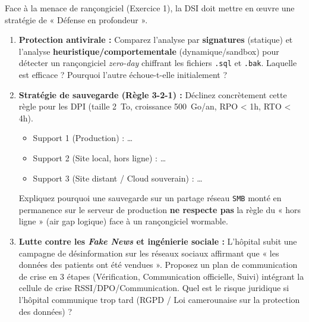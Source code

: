 \documentclass[11pt]{article}
\begin{document}
\begin{exercice}
\label{exo:defense_depth}
Face à la menace de rançongiciel (Exercice 1), la DSI doit mettre en œuvre une stratégie de « Défense en profondeur ».
\begin{enumerate}
    \item \textbf{Protection antivirale :} Comparez l'analyse par \textbf{signatures} (statique) et l'analyse \textbf{heuristique/comportementale} (dynamique/sandbox) pour détecter un rançongiciel \textit{zero-day} chiffrant les fichiers \texttt{.sql} et \texttt{.bak}. Laquelle est efficace ? Pourquoi l'autre échoue-t-elle initialement ?
    \item \textbf{Stratégie de sauvegarde (Règle 3-2-1) :} Déclinez concrètement cette règle pour les DPI (taille \SI{2}{To}, croissance \SI{500}{Go}/an, RPO < 1h, RTO < 4h).
        \begin{itemize}
            \item Support 1 (Production) : \dots
            \item Support 2 (Site local, hors ligne) : \dots
            \item Support 3 (Site distant / Cloud souverain) : \dots
        \end{itemize}
        Expliquez pourquoi une sauvegarde sur un partage réseau \texttt{SMB} monté en permanence sur le serveur de production \textbf{ne respecte pas} la règle du « hors ligne » (air gap logique) face à un rançongiciel wormable.
    \item \textbf{Lutte contre les \textit{Fake News} et ingénierie sociale :} L'hôpital subit une campagne de désinformation sur les réseaux sociaux affirmant que « les données des patients ont été vendues ». Proposez un plan de communication de crise en 3 étapes (Vérification, Communication officielle, Suivi) intégrant la cellule de crise RSSI/DPO/Communication. Quel est le risque juridique si l'hôpital communique trop tard (RGPD / Loi camerounaise sur la protection des données) ?
\end{enumerate}
\end{exercice}
\end{document}

